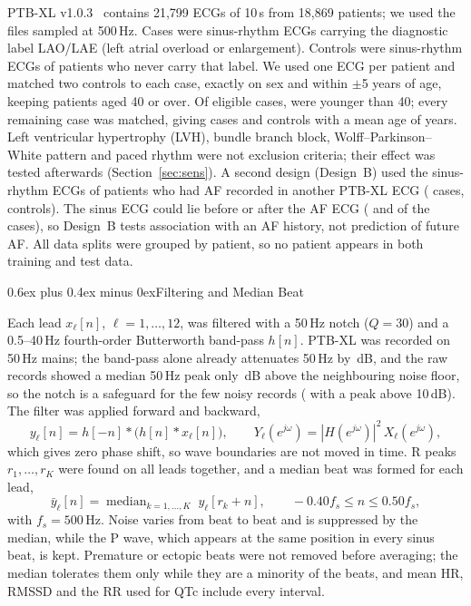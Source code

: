 \documentclass[conference]{IEEEtran}
\makeatletter
\def\subsection{\@startsection{subsection}{2}{\z@}{2.2ex plus 1ex minus 1ex}%
  {0.6ex plus 0.4ex minus 0ex}{\normalfont\normalsize\bfseries}}
\DeclareMathOperator*{\median}{median}
\makeatother
\begin{document}
PTB-XL v1.0.3~\cite{wagner2020ptbxl} contains 21{,}799 ECGs of 10\,s from 18{,}869
patients; we used the files sampled at 500\,Hz. Cases were sinus-rhythm ECGs
carrying the diagnostic label LAO/LAE (left atrial overload or enlargement).
Controls were sinus-rhythm ECGs of patients who never carry that label. We used
one ECG per patient and matched two controls to each case, exactly on sex and
within $\pm$5 years of age, keeping patients aged 40 or over. Of \nNEligCase{}
eligible cases, \nAgeLostCase{} were younger than 40; every remaining case was
matched, giving \nNMatchCase{} cases and \nNMatchCtrl{} controls with a mean age
of \nAgeMatched{} years. Left ventricular hypertrophy (LVH), bundle branch block,
Wolff--Parkinson--White pattern and paced rhythm were not exclusion criteria;
their effect was tested afterwards (Section~\ref{sec:sens}). A second design
(Design~B) used the sinus-rhythm ECGs of patients who had AF recorded in another
PTB-XL ECG (\nNBCaseMatched{} cases, \nNBCtrlMatched{} controls). The sinus ECG
could lie before or after the AF ECG (\nBBefore{} and \nBAfter{} of the
\nNBCaseMatched{} cases), so Design~B tests association with an AF history, not
prediction of future AF. All data splits were grouped by patient, so no patient appears in both
training and test data.

\subsection{Filtering and Median Beat}

Each lead $x_\ell[n]$, $\ell=1,\dots,12$, was filtered with a 50\,Hz notch
($Q=30$) and a 0.5--40\,Hz fourth-order Butterworth band-pass $h[n]$. PTB-XL was
recorded on 50\,Hz mains; the band-pass alone already attenuates 50\,Hz by
\nNotchBpDb\,dB, and the raw records showed a median 50\,Hz peak only
\nNotchMedDb\,dB above the neighbouring noise floor, so the notch is a safeguard
for the few noisy records (\nNotchOverTen{} with a peak above 10\,dB). The filter was applied
forward and backward,
\begin{equation}
y_\ell[n] = h[-n] * \big(h[n] * x_\ell[n]\big), \qquad
Y_\ell(e^{j\omega}) = |H(e^{j\omega})|^2\, X_\ell(e^{j\omega}),
\end{equation}
which gives zero phase shift, so wave boundaries are not moved in time. R peaks
$r_1,\dots,r_K$ were found on all leads together, and a median beat was formed
for each lead,
\begin{equation}
\bar{y}_\ell[n] = \median_{k=1,\dots,K}\; y_\ell[r_k+n], \qquad
-0.40f_s \le n \le 0.50f_s ,
\end{equation}
with $f_s=500$\,Hz. Noise varies from beat to beat and is suppressed by the
median, while the P wave, which appears at the same position in every sinus
beat, is kept. Premature or ectopic beats were not removed before averaging; the
median tolerates them only while they are a minority of the beats, and mean HR,
RMSSD and the RR used for QTc include every interval.
\end{document}
